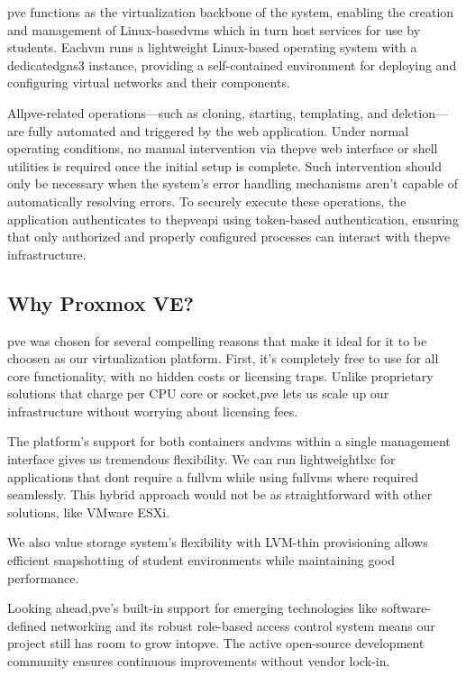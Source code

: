     \ac{pve} functions as the virtualization backbone of the system, enabling the creation and management of Linux-based\ac{vm}s 
    which in turn host services for use by students. Each\ac{vm} runs a lightweight Linux-based operating system with a 
    dedicated\ac{gns3} instance, providing a self-contained environment for deploying and configuring virtual networks 
    and their components.

    All\ac{pve}-related operations—such as cloning, starting, templating, and deletion—are fully automated and triggered by the 
    web application. Under normal operating conditions, no manual intervention via the\ac{pve} web interface or shell utilities 
    is required once the initial setup is complete. Such intervention should only be necessary when the system's error handling 
    mechanisms aren't capable of automatically resolving errors. To securely execute these operations, the application 
    authenticates to the\ac{pve}\ac{api} using token-based authentication, ensuring that only authorized and properly configured 
    processes can interact with the\ac{pve} infrastructure.

    \subsection{Why Proxmox VE?}

        \ac{pve} was chosen for several compelling reasons that make it ideal for it to be choosen as our virtualization platform. First, 
        it's completely free to use for all core functionality, with no hidden costs or licensing traps. Unlike proprietary solutions that 
        charge per CPU core or socket,\ac{pve} lets us scale up our infrastructure without worrying about licensing fees.

        The platform's support for both containers and\ac{vm}s within a single management interface gives us tremendous flexibility. We 
        can run lightweight\ac{lxc} for applications that dont require a full\ac{vm} while using full\ac{vm}s where required seamlessly. 
        This hybrid approach would not be as straightforward with other solutions, like VMware ESXi.

        We also value storage system's flexibility with LVM-thin provisioning allows efficient snapshotting of student environments while 
        maintaining good performance.

        Looking ahead,\ac{pve}'s built-in support for emerging technologies like software-defined networking and its robust role-based 
        access control system means our project still has room to grow into\ac{pve}. The active open-source development community ensures 
        continuous improvements without vendor lock-in.

